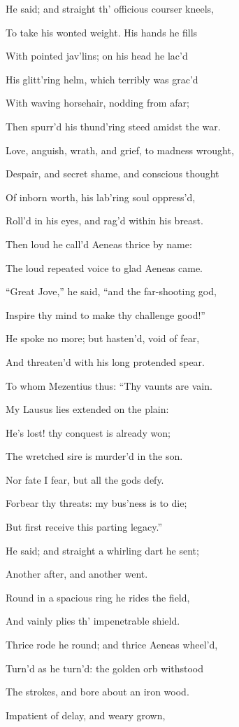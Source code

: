 He said; and straight th’ officious courser kneels,

To take his wonted weight. His hands he fills

With pointed jav’lins; on his head he lac’d

His glitt’ring helm, which terribly was grac’d

With waving horsehair, nodding from afar;

Then spurr’d his thund’ring steed amidst the war.

Love, anguish, wrath, and grief, to madness wrought,

Despair, and secret shame, and conscious thought

Of inborn worth, his lab’ring soul oppress’d,

Roll’d in his eyes, and rag’d within his breast.

Then loud he call’d Aeneas thrice by name:

The loud repeated voice to glad Aeneas came.

“Great Jove,” he said, “and the far-shooting god,

Inspire thy mind to make thy challenge good!”

He spoke no more; but hasten’d, void of fear,

And threaten’d with his long protended spear.

To whom Mezentius thus: “Thy vaunts are vain.

My Lausus lies extended on the plain:

He’s lost! thy conquest is already won;

The wretched sire is murder’d in the son.

Nor fate I fear, but all the gods defy.

Forbear thy threats: my bus’ness is to die;

But first receive this parting legacy.”

He said; and straight a whirling dart he sent;

Another after, and another went.

Round in a spacious ring he rides the field,

And vainly plies th’ impenetrable shield.

Thrice rode he round; and thrice Aeneas wheel’d,

Turn’d as he turn’d: the golden orb withstood

The strokes, and bore about an iron wood.

Impatient of delay, and weary grown,

